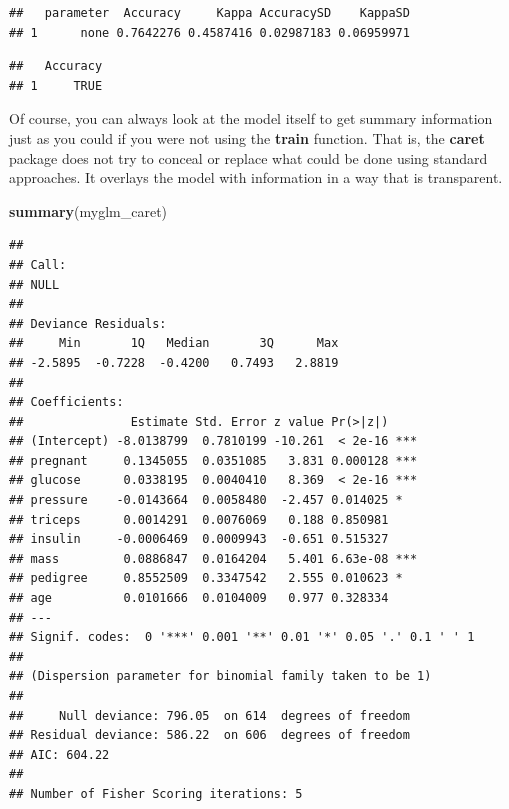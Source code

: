 \documentclass[
]{book}
\newenvironment{Shaded}{\begin{snugshade}}{\end{snugshade}}
\newcommand{\CommentTok}[1]{\textcolor[rgb]{0.56,0.35,0.01}{\textit{#1}}}
\newcommand{\DecValTok}[1]{\textcolor[rgb]{0.00,0.00,0.81}{#1}}
\newcommand{\KeywordTok}[1]{\textcolor[rgb]{0.13,0.29,0.53}{\textbf{#1}}}
\newcommand{\NormalTok}[1]{#1}
\newcommand{\OperatorTok}[1]{\textcolor[rgb]{0.81,0.36,0.00}{\textbf{#1}}}
\newcommand{\StringTok}[1]{\textcolor[rgb]{0.31,0.60,0.02}{#1}}
\begin{document}
\begin{Shaded}
\end{Shaded}

\begin{verbatim}
##   parameter  Accuracy     Kappa AccuracySD    KappaSD
## 1      none 0.7642276 0.4587416 0.02987183 0.06959971
\end{verbatim}

\begin{Shaded}
\end{Shaded}

\begin{verbatim}
##   Accuracy
## 1     TRUE
\end{verbatim}

Of course, you can always look at the model itself to get summary information just as you could if you were not using the \textbf{train} function. That is, the \textbf{caret} package does not try to conceal or replace what could be done using standard approaches. It overlays the model with information in a way that is transparent.

\begin{Shaded}
\begin{Highlighting}[]
\KeywordTok{summary}\NormalTok{(myglm_caret)}
\end{Highlighting}
\end{Shaded}

\begin{verbatim}
## 
## Call:
## NULL
## 
## Deviance Residuals: 
##     Min       1Q   Median       3Q      Max  
## -2.5895  -0.7228  -0.4200   0.7493   2.8819  
## 
## Coefficients:
##               Estimate Std. Error z value Pr(>|z|)    
## (Intercept) -8.0138799  0.7810199 -10.261  < 2e-16 ***
## pregnant     0.1345055  0.0351085   3.831 0.000128 ***
## glucose      0.0338195  0.0040410   8.369  < 2e-16 ***
## pressure    -0.0143664  0.0058480  -2.457 0.014025 *  
## triceps      0.0014291  0.0076069   0.188 0.850981    
## insulin     -0.0006469  0.0009943  -0.651 0.515327    
## mass         0.0886847  0.0164204   5.401 6.63e-08 ***
## pedigree     0.8552509  0.3347542   2.555 0.010623 *  
## age          0.0101666  0.0104009   0.977 0.328334    
## ---
## Signif. codes:  0 '***' 0.001 '**' 0.01 '*' 0.05 '.' 0.1 ' ' 1
## 
## (Dispersion parameter for binomial family taken to be 1)
## 
##     Null deviance: 796.05  on 614  degrees of freedom
## Residual deviance: 586.22  on 606  degrees of freedom
## AIC: 604.22
## 
## Number of Fisher Scoring iterations: 5
\end{verbatim}
\end{document}
